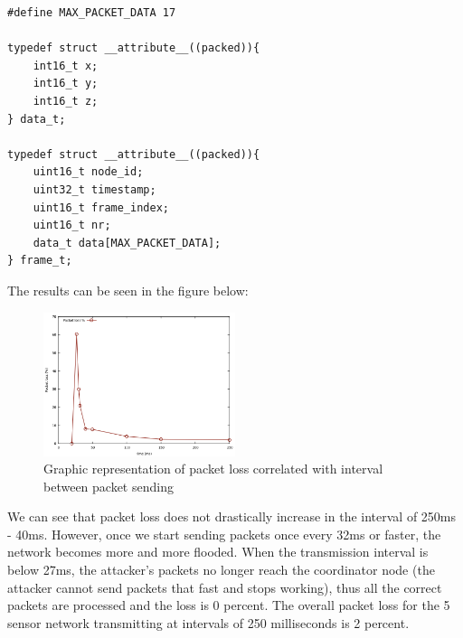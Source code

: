 \begin{lstlisting}
#define MAX_PACKET_DATA 17

typedef struct __attribute__((packed)){
	int16_t x;
	int16_t y;
	int16_t z;
} data_t;

typedef struct __attribute__((packed)){
	uint16_t node_id;
	uint32_t timestamp;
	uint16_t frame_index;
	uint16_t nr;
	data_t data[MAX_PACKET_DATA];
} frame_t;
\end{lstlisting}

The results can be seen in the figure below:

\begin{figure}[ht] \centering
  \includegraphics[width=0.5\textwidth]{img/packet-loss.png}
  \caption{Graphic representation of packet loss correlated with interval between packet sending}
\end{figure}

We can see that packet loss does not drastically increase in the interval of 250ms - 40ms. However, 
once we start sending packets once every 32ms or faster, the network becomes more and more flooded.
When the transmission interval is below 27ms, the attacker's packets no longer reach the coordinator
node (the attacker cannot send packets that fast and stops working), thus all the correct packets are 
processed and the loss is 0 percent. The overall packet loss for the 5 sensor network transmitting at 
intervals of 250 milliseconds is 2 percent.
